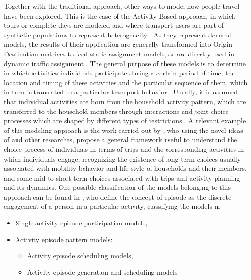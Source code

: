 \documentclass[Journal,letterpaper]{ascelike-new}
\begin{document}
Together with the traditional approach, other ways to model how people travel have been explored. This is the case of the Activity-Based approach, in which tours or complete days are modeled and where transport users are part of synthetic populations to represent heterogeneity \citep{flugel2014evaluation}. As they represent demand models, the results of their application are generally transformed into Origin-Destination matrices to feed static assignment models, or are directly used in dynamic traffic assignment \citep{lin2008integration}. The general purpose of these models is to determine in which activities individuals participate during a certain period of time, the location and timing of these activities and the particular sequence of them, which in turn is translated to a particular transport behavior \citep{Ettema96}. Usually, it is assumed that individual activities are born from the household activity pattern, which are transferred to the household members through interactions and joint choice processes which are shaped by different types of restrictions \citep{McNallyAndRindt2008}.  A relevant example of this modeling approach is the work carried out by \cite{Mosh-1996}, who using the novel ideas of \cite{hagerstraand1970people} and other researches, propose a general framework useful to understand the choice process of individuals in terms of trips and the corresponding activities in which individuals engage, recognizing the existence of long-term choices usually associated with mobility behavior and life-style of households and their members, and some mid to short-term choices associated with trips and activity planning and its dynamics.
One possible classification of the models belonging to this approach can be found in \cite{Bhat2003}, who define the concept of episode as the discrete engagement of a person in a particular activity, classifying the models in
\begin{itemize}
    \item Single activity episode participation models,
    \item Activity episode pattern models:
    \begin{itemize}
        \item Activity episode scheduling models,
        \item Activity episode generation and scheduling models
    \end{itemize}
\end{itemize}
\end{document}
